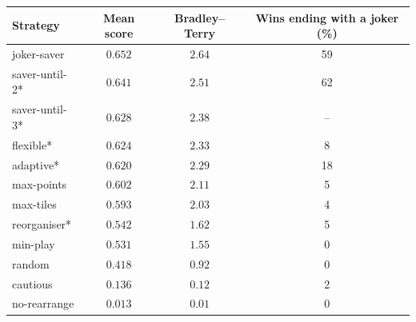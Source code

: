 \begin{tabular}{@{}lccc@{}}\toprule
Strategy & Mean score & Bradley--Terry & Wins ending with a joker (\%)\\\midrule
joker-saver & $0.652$ & $2.64$ & 59 \\
saver-until-2* & $0.641$ & $2.51$ & 62 \\
saver-until-3* & $0.628$ & $2.38$ & -- \\
flexible* & $0.624$ & $2.33$ & 8 \\
adaptive* & $0.620$ & $2.29$ & 18 \\
max-points & $0.602$ & $2.11$ & 5 \\
max-tiles & $0.593$ & $2.03$ & 4 \\
reorganiser* & $0.542$ & $1.62$ & 5 \\
min-play & $0.531$ & $1.55$ & 0 \\
random & $0.418$ & $0.92$ & 0 \\
cautious & $0.136$ & $0.12$ & 2 \\
no-rearrange & $0.013$ & $0.01$ & 0 \\
\bottomrule\end{tabular}
